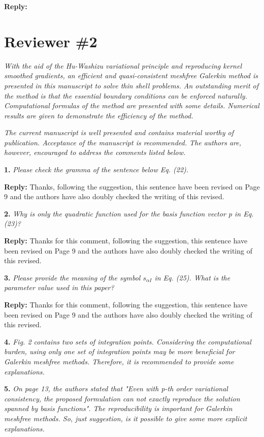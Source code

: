 \documentclass{article}
\begin{document}
\textbf{Reply:}

\section*{Reviewer \#2}
\textit{With the aid of the Hu-Washizu variational principle and reproducing kernel smoothed gradients, an efficient and quasi-consistent meshfree Galerkin method is presented in this manuscript to solve thin shell problems. An outstanding merit of the method is that the essential boundary conditions can be enforced naturally. Computational formulas of the method are presented with some details. Numerical results are given to demonstrate the efficiency of the method.}

\textit{The current manuscript is well presented and contains material worthy of publication. Acceptance of the manuscript is recommended. The authors are, however, encouraged to address the comments listed below.}

\textbf{1.} \textit{Please check the gramma of the sentence below Eq. (22).}

\textbf{Reply:} Thanks, following the suggestion, this sentence have been revised on Page 9 and the authors have also doubly checked the writing of this revised.

\textbf{2.} \textit{Why is only the quadratic function used for the basis function vector p in Eq. (23)?}

\textbf{Reply:} Thanks for this comment, following the suggestion, this sentence have been revised on Page 9 and the authors have also doubly checked the writing of this revised.

\textbf{3.} \textit{Please provide the meaning of the symbol $s_{\alpha I}$ in Eq. (25). What is the parameter value used in this paper?}

\textbf{Reply:} Thanks for this comment, following the suggestion, this sentence have been revised on Page 9 and the authors have also doubly checked the writing of this revised.

\textbf{4.} \textit{Fig. 2 contains two sets of integration points. Considering the computational burden, using only one set of integration points may be more beneficial for Galerkin meshfree methods. Therefore, it is recommended to provide some explanations.}

\textbf{5.} \textit{On page 13, the authors stated that "Even with p-th order variational consistency, the proposed formulation can not exactly reproduce the solution spanned by basis functions". The reproducibility is important for Galerkin meshfree methods. So, just suggestion, is it possible to give some more explicit explanations.}
\end{document}
